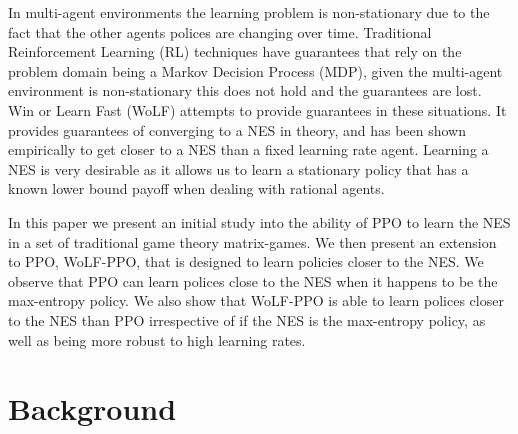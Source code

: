 \documentclass[conference]{IEEEtran}
\begin{document}
In multi-agent environments the learning problem is non-stationary due to the fact that the other agents polices are changing over time. Traditional Reinforcement Learning (RL) techniques have guarantees that rely on the problem domain being a Markov Decision Process (MDP), given the multi-agent environment is non-stationary this does not hold and the guarantees are lost. Win or Learn Fast (WoLF) attempts to provide guarantees in these situations\cite{bowling2002multiagent}. It provides guarantees of converging to a NES in theory, and has been shown empirically to get closer to a NES than a fixed learning rate agent. Learning a NES is very desirable as it allows us to learn a stationary policy that has a known lower bound payoff when dealing with rational agents.

In this paper we present an initial study into the ability of PPO to learn the NES in a set of traditional game theory matrix-games. We then present an extension to PPO, WoLF-PPO, that is designed to learn policies closer to the NES. We observe that PPO can learn polices close to the NES when it happens to be the max-entropy policy. We also show that WoLF-PPO is able to learn polices closer to the NES than PPO irrespective of if the NES is the max-entropy policy, as well as being more robust to high learning rates.

\section{Background}


\end{document}
